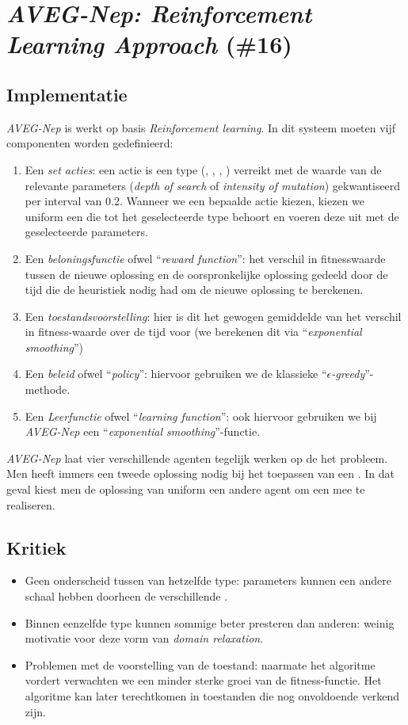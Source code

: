 \section{\emph{AVEG-Nep: Reinforcement Learning Approach} (\#16)}

\subsection{Implementatie}
\emph{AVEG-Nep}\cite{chesc-aveg-nep} is werkt op basis \emph{Reinforcement learning}\cite{rlaiacaml}. In dit systeem moeten vijf componenten worden gedefinieerd:
\begin{enumerate}
 \item Een \emph{set acties}: een actie is een type \abllhn{} (\abmt{}, \abls{}, \abco{}, \abrr{}) verreikt met de waarde van de relevante parameters (\emph{depth of search} of \emph{intensity of mutation}) gekwantiseerd per interval van 0.2. Wanneer we een bepaalde actie kiezen, kiezen we uniform een \abllh{} die tot het geselecteerde type behoort en voeren deze uit met de geselecteerde parameters.
 \item Een \emph{beloningsfunctie} ofwel ``\emph{reward function}'': het verschil in fitnesswaarde tussen de nieuwe oplossing en de oorspronkelijke oplossing gedeeld door de tijd die de heuristiek nodig had om de nieuwe oplossing te berekenen.
 \item Een \emph{toestandsvoorstelling}: hier is dit het gewogen gemiddelde van het verschil in fitness-waarde over de tijd voor (we berekenen dit via ``\emph{exponential smoothing}''\cite{Taylor2003a})
 \item Een \emph{beleid} ofwel ``\emph{policy}'': hiervoor gebruiken we de klassieke ``\emph{$\epsilon$-greedy}''-methode.
 \item Een \emph{Leerfunctie} ofwel ``\emph{learning function}'': ook hiervoor gebruiken we bij \emph{AVEG-Nep} een ``\emph{exponential smoothing}''-functie.
\end{enumerate}
\emph{AVEG-Nep} laat vier verschillende agenten tegelijk werken op de het probleem. Men heeft immers een tweede oplossing nodig bij het toepassen van een \abco{} \abh{}. In dat geval kiest men de oplossing van uniform een andere agent om een \abco{} mee te realiseren.

\subsection{Kritiek}
\begin{itemize}
 \item Geen onderscheid tussen \abhn{} van hetzelfde type: parameters kunnen een andere schaal hebben doorheen de verschillende \abhn{}.
 \item Binnen eenzelfde type kunnen sommige \abhn{} beter presteren dan anderen: weinig motivatie voor deze vorm van \emph{domain relaxation}.
 \item Problemen met de voorstelling van de toestand: naarmate het algoritme vordert verwachten we een minder sterke groei van de fitness-functie. Het algoritme kan later terechtkomen in toestanden die nog onvoldoende verkend zijn.
\end{itemize}